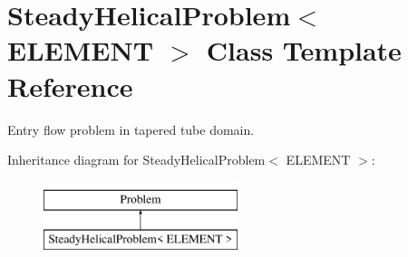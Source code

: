 \hypertarget{classSteadyHelicalProblem}{}\section{Steady\+Helical\+Problem$<$ E\+L\+E\+M\+E\+NT $>$ Class Template Reference}
\label{classSteadyHelicalProblem}


Entry flow problem in tapered tube domain.  


Inheritance diagram for Steady\+Helical\+Problem$<$ E\+L\+E\+M\+E\+NT $>$\+:\begin{figure}[H]
\begin{center}
\leavevmode
\includegraphics[height=2.000000cm]{classSteadyHelicalProblem}
\end{center}
\end{figure}

